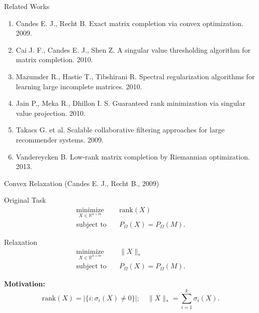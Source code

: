 \documentclass{beamer}
\begin{document}
\begin{frame}{Related Works}
	\begin{enumerate}
		\item Candes E. J., Recht B. Exact matrix completion via convex optimization. 2009.
		\item Cai J. F., Candes E. J., Shen Z. A singular value thresholding algorithm for matrix completion. 2010.
		\item Mazumder R., Hastie T., Tibshirani R. Spectral regularization algorithms for learning large incomplete matrices. 2010.
		\item Jain P., Meka R., Dhillon I. S. Guaranteed rank minimization via singular value projection. 2010.
		\item Takacs G. et al. Scalable collaborative filtering approaches for large recommender systems. 2009.
		\item Vandereycken B. Low-rank matrix completion by Riemannian optimization. 2013.
	\end{enumerate}
\end{frame}
\begin{frame}{Convex Relaxation (Candes E. J., Recht B., 2009)}
\begin{block}{Original Task}
\vspace{-0.5cm}
	\begin{align*}
	\mathop{\text{minimize}}\limits_{X \in \mathbb{R}^{n \times m}} \quad & 
	\text{rank} (X) \\
	\text{subject to} \quad & P_{\Omega} (X) = P_{\Omega} (M).
	\end{align*}
\end{block}
\begin{block}{Relaxation}
\vspace{-0.5cm}
	\begin{align*}
	\mathop{\text{minimize}}\limits_{X \in \mathbb{R}^{n \times m}} \quad & 
	\| X \|_* \\
	\text{subject to} \quad & P_{\Omega} (X) = P_{\Omega} (M).
	\end{align*}
\end{block}
\textbf{Motivation:}
$$
	\text{rank} (X) = |\{ i: \sigma_i(X) \neq 0\}|; \quad 
	\| X \|_* = \sum_{i=1}^{k} \sigma_i(X).
$$
\end{frame}
\end{document}
